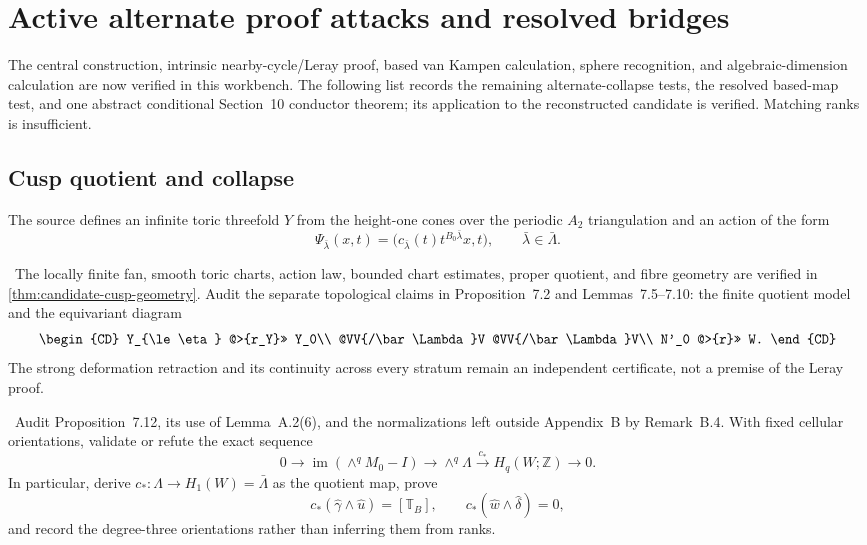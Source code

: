\section{Active alternate proof attacks and resolved bridges}

The central construction, intrinsic nearby-cycle/Leray proof, based van
Kampen calculation, sphere recognition, and algebraic-dimension calculation
are now verified in this workbench.  The following list records the remaining
alternate-collapse tests, the resolved based-map test, and one abstract
conditional Section~10 conductor theorem; its application to the reconstructed
candidate is verified.  Matching ranks is insufficient.

\subsection{Cusp quotient and collapse}

The source defines an infinite toric threefold $Y$ from the height-one cones over the periodic $A_2$ triangulation and an action of the form
\[
\Psi_{\bar\lambda}(x,t)
=\bigl(c_{\bar\lambda}(t)t^{B_0\bar\lambda}x,t\bigr),
\qquad \bar\lambda\in\bar\Lambda.
\]

\begin{obligation}
\Open\ The locally finite fan, smooth toric charts, action law, bounded
chart estimates, proper quotient, and fibre geometry are verified in
\cref{thm:candidate-cusp-geometry}.  Audit the separate
topological claims in Proposition~7.2 and Lemmas~7.5--7.10: the finite
quotient model and the equivariant diagram
\[
\begin{CD}
Y_{\le\eta} @>{r_Y}>> Y_0\\
@VV{/\bar\Lambda}V @VV{/\bar\Lambda}V\\
N'_0 @>{r}>> W.
\end{CD}
\]
The strong deformation retraction and its continuity across every stratum
remain an independent certificate, not a premise of the Leray proof.
\end{obligation}

\begin{obligation}
\Open\ Audit Proposition~7.12, its use of Lemma~A.2(6), and the normalizations
left outside Appendix~B by Remark~B.4.  With fixed cellular orientations,
validate or refute the exact sequence
\[
0\longrightarrow
\operatorname{im}(\wedge^qM_0-I)
\longrightarrow\wedge^q\Lambda
\xrightarrow{c_*}H_q(W;\mathbb Z)
\longrightarrow0.
\]
In particular, derive $c_*\colon\Lambda\to H_1(W)=\bar\Lambda$ as the quotient map, prove
\[
c_*(\widehat\gamma\wedge\widehat u)=[\mathbb T_B],
\qquad
c_*(\widehat w\wedge\widehat\delta)=0,
\]
and record the degree-three orientations rather than inferring them from ranks.
\end{obligation}


